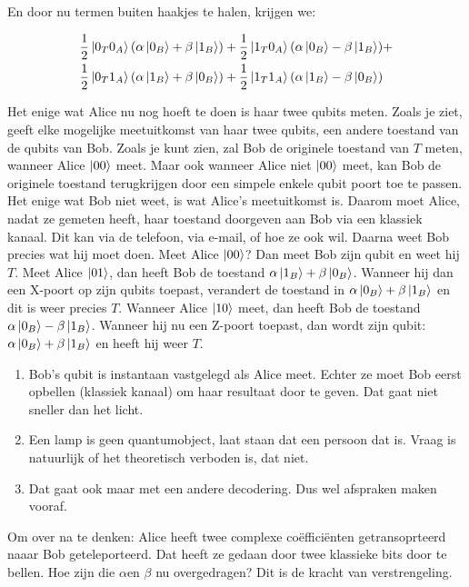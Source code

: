 \documentclass[../../main.tex]{subfiles}
\begin{document}
En door nu termen buiten haakjes te halen, krijgen we:

\[\begin{aligned}
\frac{1}{2}\ket{0_T0_A}(\alpha\ket{0_B}+\beta\ket{1_B}) +\frac{1}{2}\ket{1_T0_A}(\alpha\ket{0_B} &- \beta\ket{1_B}) +\\
\frac{1}{2}\ket{0_T1_A}(\alpha\ket{1_B} + \beta\ket{0_B}) +\frac{1}{2}\ket{1_T1_A}(\alpha\ket{1_B} &- \beta\ket{0_B})\\
\end{aligned}\]


Het enige wat Alice nu nog hoeft te doen is haar twee qubits meten. Zoals je ziet, geeft elke mogelijke meetuitkomst van haar twee qubits, een andere toestand van de qubits van Bob. Zoals je kunt zien, zal Bob de originele toestand van $T$ meten, wanneer Alice $\ket{00}$ meet. Maar ook wanneer Alice niet $\ket{00}$ meet, kan Bob de originele toestand terugkrijgen door een simpele enkele qubit poort toe te passen. Het enige wat Bob niet weet, is wat Alice's meetuitkomst is. Daarom moet Alice, nadat ze gemeten heeft, haar toestand doorgeven aan Bob via een klassiek kanaal. Dit kan via de telefoon, via e-mail, of hoe ze ook wil. Daarna weet Bob precies wat hij moet doen. Meet Alice $\ket{00}$? Dan meet Bob zijn qubit en weet hij $T$. Meet Alice $\ket{01}$, dan heeft Bob de toestand $\alpha\ket{1_B} + \beta\ket{0_B}$. Wanneer hij dan een X-poort op zijn qubits toepast, verandert de toestand in $\alpha\ket{0_B} + \beta\ket{1_B}$ en dit is weer precies $T$. Wanneer Alice $\ket{10}$ meet, dan heeft Bob de toestand $\alpha\ket{0_B} - \beta\ket{1_B}$. Wanneer hij nu een Z-poort toepast, dan wordt zijn qubit: $\alpha\ket{0_B} + \beta\ket{1_B}$ en heeft hij weer $T$.

\begin{enumerate}[start=9]
\item Bob's qubit is instantaan vastgelegd als Alice meet. Echter ze moet Bob eerst opbellen (klassiek kanaal) om haar resultaat door te geven. Dat gaat niet sneller dan het licht.
\item Een lamp is geen quantumobject,  laat staan dat een persoon dat is.  Vraag is natuurlijk of het theoretisch verboden is, dat niet.
\item Dat gaat ook maar met een andere decodering. Dus wel afspraken maken vooraf.
\end{enumerate}

Om over na te denken: Alice heeft twee complexe co\"effici\"enten getransoprteerd naaar Bob geteleporteerd. Dat heeft ze gedaan door twee klassieke bits door te bellen.
Hoe zijn die $\alpha$en  $\beta$ nu overgedragen? Dit is de kracht van verstrengeling.
\end{document}
